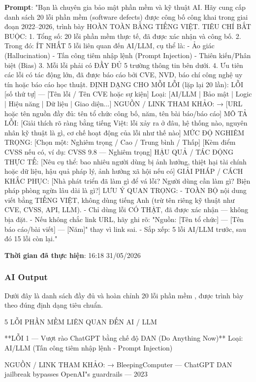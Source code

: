 \textbf{Prompt}: "Bạn là chuyên gia bảo mật phần mềm và kỹ thuật AI. Hãy cung cấp danh sách  20 lỗi phần mềm (software defects) được công bố công khai trong giai đoạn  2022–2026, trình bày HOÀN TOÀN BẰNG TIẾNG VIỆT. TIÊU CHÍ BẮT BUỘC: 1. Tổng số: 20 lỗi phần mềm thực tế, đã được xác nhận và công bố. 2. Trong đó: ÍT NHẤT 5 lỗi liên quan đến AI/LLM, cụ thể là:    - Ảo giác (Hallucination)    - Tấn công tiêm nhập lệnh (Prompt Injection)    - Thiên kiến/Phân biệt (Bias) 3. Mỗi lỗi phải có ĐẦY ĐỦ 5 trường thông tin bên dưới. 4. Ưu tiên các lỗi có tác động lớn, đã được báo cáo bởi CVE, NVD,     báo chí công nghệ uy tín hoặc báo cáo học thuật. ĐỊNH DẠNG CHO MỖI LỖI (lặp lại 20 lần): LỖI [số thứ tự] — [Tên lỗi / Tên CVE hoặc sự kiện] Loại: [AI/LLM | Bảo mật | Logic | Hiệu năng | Dữ liệu | Giao diện...] NGUỒN / LINK THAM KHẢO: → [URL hoặc tên nguồn đầy đủ: tên tổ chức công bố, năm, tên bài báo/báo cáo] MÔ TẢ LỖI: [Giải thích rõ ràng bằng tiếng Việt: lỗi xảy ra ở đâu, hệ thống nào,  nguyên nhân kỹ thuật là gì, cơ chế hoạt động của lỗi như thế nào] MỨC ĐỘ NGHIÊM TRỌNG: [Chọn một: Nghiêm trọng / Cao / Trung bình / Thấp] [Kèm điểm CVSS nếu có, ví dụ: CVSS 9.8 — Nghiêm trọng] HẬU QUẢ / TÁC ĐỘNG THỰC TẾ: [Nêu cụ thể: bao nhiêu người dùng bị ảnh hưởng, thiệt hại tài chính  hoặc dữ liệu, hậu quả pháp lý, ảnh hưởng xã hội nếu có] GIẢI PHÁP / CÁCH KHẮC PHỤC: [Nhà phát triển đã làm gì để vá lỗi? Người dùng cần làm gì?  Biện pháp phòng ngừa lâu dài là gì?] LƯU Ý QUAN TRỌNG: - TOÀN BỘ nội dung viết bằng TIẾNG VIỆT, không dùng tiếng Anh (trừ tên riêng kỹ thuật như CVE, CVSS, API, LLM). - Chỉ dùng lỗi CÓ THẬT, đã được xác nhận — không bịa đặt. - Nếu không chắc link URL, hãy ghi rõ: "Nguồn: [Tên tổ chức] —    [Tên báo cáo/bài viết] — [Năm]" thay vì link sai. - Sắp xếp: 5 lỗi AI/LLM trước, sau đó 15 lỗi còn lại."

\textbf{Thời gian đã thực hiện}: 16:18 31/05/2026

\vspace{0.1cm}
\subsubsection{AI Output}
Dưới đây là danh sách đầy đủ và hoàn chỉnh 20 lỗi phần mềm , được trình bày theo đúng định dạng tiêu chuẩn.

5 LỖI PHẦN MỀM LIÊN QUAN ĐẾN AI / LLM

**LỖI 1 — Vượt rào ChatGPT bằng chế độ DAN (Do Anything Now)**
Loại: AI/LLM (Tấn công tiêm nhập lệnh - Prompt Injection)

NGUỒN / LINK THAM KHẢO:
→ BleepingComputer — ChatGPT DAN jailbreak bypasses OpenAI"s guardrails — 2023

